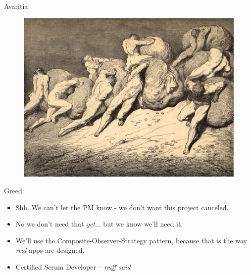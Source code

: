 \documentclass[12pt,xcolor=x11names]{beamer}
\begin{document}
\begin{frame}{Avaritia}
    \begin{figure}
        \centering \includegraphics[height=0.75\textheight]{images/greed.jpg}
    \end{figure}
\end{frame}
\begin{frame}{Greed}
    \begin{itemize}
        \item Shh. We can't let the PM know - we don't want this project
            canceled.
        \item No we don't need that \emph{yet}... but we know we'll need it.
        \item We'll use the Composite-Observer-Strategy pattern, because that
            is the way \emph{real} apps are designed.
        \item Certified Scrum Developer -- \emph{nuff said}
    \end{itemize}
\end{frame}
\end{document}
